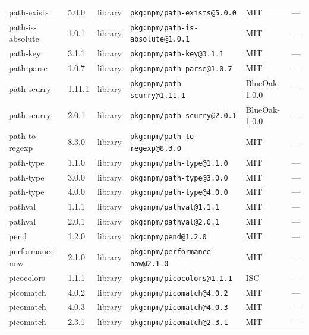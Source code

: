 \documentclass[11pt,a4paper]{article}
\begin{document}
\begin{longtable}{|p{4cm}|p{2cm}|p{1.6cm}|p{5cm}|p{1.5cm}|p{3.5cm}|}
\raggedright path-exists & 5.0.0 & library & \small\texttt{pkg:npm/path-exists@5.0.0} & MIT & \small — \\
\raggedright path-is-absolute & 1.0.1 & library & \small\texttt{pkg:npm/path-is-absolute@1.0.1} & MIT & \small — \\
\raggedright path-key & 3.1.1 & library & \small\texttt{pkg:npm/path-key@3.1.1} & MIT & \small — \\
\raggedright path-parse & 1.0.7 & library & \small\texttt{pkg:npm/path-parse@1.0.7} & MIT & \small — \\
\raggedright path-scurry & 1.11.1 & library & \small\texttt{pkg:npm/path-scurry@1.11.1} & BlueOak-1.0.0 & \small — \\
\raggedright path-scurry & 2.0.1 & library & \small\texttt{pkg:npm/path-scurry@2.0.1} & BlueOak-1.0.0 & \small — \\
\raggedright path-to-regexp & 8.3.0 & library & \small\texttt{pkg:npm/path-to-regexp@8.3.0} & MIT & \small — \\
\raggedright path-type & 1.1.0 & library & \small\texttt{pkg:npm/path-type@1.1.0} & MIT & \small — \\
\raggedright path-type & 3.0.0 & library & \small\texttt{pkg:npm/path-type@3.0.0} & MIT & \small — \\
\raggedright path-type & 4.0.0 & library & \small\texttt{pkg:npm/path-type@4.0.0} & MIT & \small — \\
\raggedright pathval & 1.1.1 & library & \small\texttt{pkg:npm/pathval@1.1.1} & MIT & \small — \\
\raggedright pathval & 2.0.1 & library & \small\texttt{pkg:npm/pathval@2.0.1} & MIT & \small — \\
\raggedright pend & 1.2.0 & library & \small\texttt{pkg:npm/pend@1.2.0} & MIT & \small — \\
\raggedright performance-now & 2.1.0 & library & \small\texttt{pkg:npm/performance-now@2.1.0} & MIT & \small — \\
\raggedright picocolors & 1.1.1 & library & \small\texttt{pkg:npm/picocolors@1.1.1} & ISC & \small — \\
\raggedright picomatch & 4.0.2 & library & \small\texttt{pkg:npm/picomatch@4.0.2} & MIT & \small — \\
\raggedright picomatch & 4.0.3 & library & \small\texttt{pkg:npm/picomatch@4.0.3} & MIT & \small — \\
\raggedright picomatch & 2.3.1 & library & \small\texttt{pkg:npm/picomatch@2.3.1} & MIT & \small — \\

\end{longtable}
\end{document}
